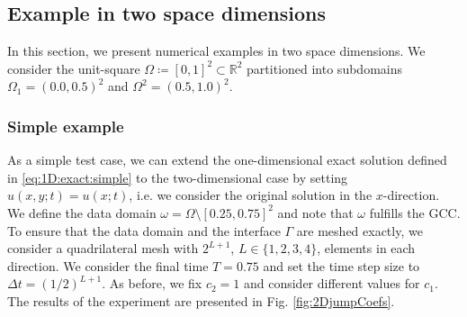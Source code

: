 \documentclass[sn-mathphys-num]{sn-jnl}
\numberwithin{equation}{section}
\begin{document}
\subsection{Example in two space dimensions}
\noindent In this section, we present numerical examples in two space dimensions. We consider the unit-square $\Omega \coloneqq [0,1]^2 \subset \mathbb{R}^2$ partitioned into subdomains $\Omega_1 = (0.0,0.5)^2$ and $\Omega^2 = (0.5,1.0)^2$. 

\subsubsection{Simple example} 
As a simple test case, we can extend the one-dimensional exact solution defined in \eqref{eq:1D:exact:simple} to the two-dimensional case by setting $u(x,y;t) = u(x;t)$, i.e. we consider the original solution in the $x$-direction. We define the data domain $\omega = \Omega \setminus [0.25,0.75]^2$ and note that $\omega$ fulfills the GCC. To ensure that the data domain and the interface $\Gamma$ are meshed exactly, we consider a quadrilateral mesh with $2^{L+1}$, $L \in \{1,2,3,4\}$, elements in each direction. We consider the final time $T = 0.75$  and set the time step size to $\Delta t = (1/2)^{L+1}$. As before, we fix $c_2 = 1$ and consider different values for $c_1$. The results of the experiment are presented in Fig. \ref{fig:2DjumpCoefs}. 
\end{document}
